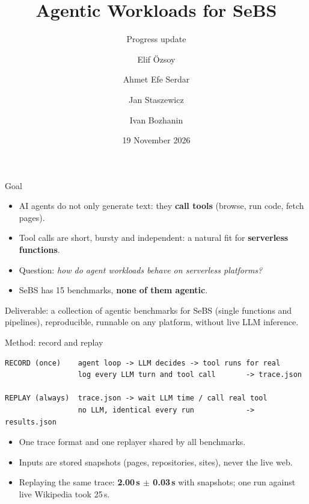 \documentclass[aspectratio=169,11pt]{beamer}
\title{Agentic Workloads for SeBS}
\subtitle{Progress update}
\author{Elif \"Ozsoy \and Ahmet Efe Serdar \and Jan Staszewicz \and Ivan Bozhanin}
\institute{DPHPC HS26 \quad Mentor: Marcin Copik}
\date{19 November 2026}
\begin{document}
\begin{frame}
  \titlepage
\end{frame}

\begin{frame}{Goal}
  \begin{itemize}
    \item AI agents do not only generate text: they \textbf{call tools} (browse, run code, fetch pages).
    \item Tool calls are short, bursty and independent: a natural fit for \textbf{serverless functions}.
    \item Question: \emph{how do agent workloads behave on serverless platforms?}
    \item SeBS has 15 benchmarks, \textbf{none of them agentic}.
  \end{itemize}
  \vspace{1em}
  Deliverable: a collection of agentic benchmarks for SeBS (single functions and pipelines),
  reproducible, runnable on any platform, without live LLM inference.
\end{frame}

\begin{frame}[fragile]{Method: record and replay}
\footnotesize
\begin{verbatim}
RECORD (once)    agent loop -> LLM decides -> tool runs for real
                 log every LLM turn and tool call       -> trace.json

REPLAY (always)  trace.json -> wait LLM time / call real tool
                 no LLM, identical every run            -> results.json
\end{verbatim}
\normalsize
  \begin{itemize}
    \item One trace format and one replayer shared by all benchmarks.
    \item Inputs are stored snapshots (pages, repositories, sites), never the live web.
    \item Replaying the same trace: \textbf{2.00\,s $\pm$ 0.03\,s} with snapshots;
          one run against live Wikipedia took 25\,s.
  \end{itemize}
\end{frame}
\end{document}
